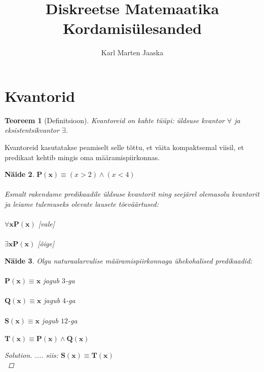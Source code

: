 \documentclass[12pt]{article}
\newtheorem{theorem}{Teoreem}[section]
\newtheorem{example}[theorem]{Näide}
\newenvironment{solution}{
    \begin{proof}[Solution]
}{\end{proof}}
\begin{document}
\title{Diskreetse Matemaatika Kordamisülesanded} 
\author{Karl Marten Jaaska}
\maketitle

\newpage 
\tableofcontents
\newpage

\section{Kvantorid}
\begin{theorem}[Definitsioon]
\leavevmode

Kvantoreid on kahte tüüpi: üldsuse kvantor $\forall$ ja eksistentsikvantor $\exists$.
\end{theorem}
\noindent
Kvantoreid kasutatakse peamiselt selle tõttu, et väita kompaktsemal viisil, et 
predikaat kehtib mingis oma määramispiirkonnas.
\newline
\begin{example}
$\mathbf{P(x)} \equiv (x > 2) \wedge (x < 4)$ \\ 
\\ Esmalt rakendame predikaadile üldsuse kvantorit ning seejärel olemasolu kvantorit ja leiame tulemuseks olevate 
lausete tõeväärtused: \\ 
\\ $\forall\mathbf{x}\mathbf{P(x)}$ [vale] \\ 
\\ $\exists\mathbf{x}\mathbf{P(x)}$ [õige] \\
\end{example}
\begin{example}
	Olgu naturaalarvulise määramispiirkonnaga ühekohalised predikaadid: \\ 
	\\
	$\mathbf{P(x)} \equiv \mathit{\mathbf{x}}$ jagub $3$-ga \\ 
	\\
	$\mathbf{Q(x)} \equiv \mathbf{x}$ jagub $4$-ga \\ 
	\\ 
	$\mathbf{S(x)} \equiv \mathbf{x}$ jagub $12$-ga \\ 
	\\ 
	$\mathbf{T(x)} \equiv \mathbf{P(x)} \wedge \mathbf{Q(x)}$ \\ 
	\begin{solution}
	.... siis: $\mathbf{S(x)} \equiv \mathbf{T(x)}$ \\
	\end{solution}
\end{example}
\end{document}
